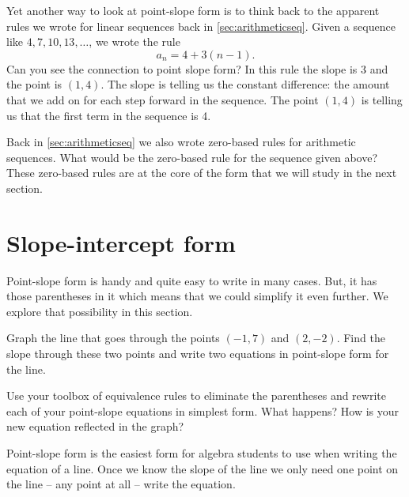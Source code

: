 Yet another way to look at point-slope form is to think back to the apparent rules we wrote for linear sequences back in \cref{sec:arithmeticseq}. Given a sequence like $4, 7, 10, 13,\dotsc$, we wrote the rule \[a_n = 4 + 3 (n-1).\] Can you see the connection to point slope form? In this rule the slope is 3 and the point is $(1,4)$. The slope is telling us the constant difference: the amount that we add on for each step forward in the sequence. The point $(1,4)$ is telling us that the first term in the sequence is 4.

Back in \cref{sec:arithmeticseq} we also wrote zero-based rules for arithmetic sequences. What would be the zero-based rule for the sequence given above? These zero-based rules are at the core of the form that we will study in the next section.

\section{Slope-intercept form}
\label{sec:slopeinterceptform}

Point-slope form is handy and quite easy to write in many cases. But, it has those parentheses in it which means that we could simplify it even further. We explore that possibility in this section.


\begin{boxexplore}
Graph the line that goes through the points $(-1, 7)$ and $(2, -2)$. Find the slope through these two points and write two equations in point-slope form for the line.

Use your toolbox of equivalence rules to eliminate the parentheses and rewrite each of your point-slope equations in simplest form. What happens? How is your new equation reflected in the graph?
\end{boxexplore} %

Point-slope form is the easiest form for algebra students to use when writing the equation of a line. Once we know the slope of the line we only need one point on the line -- any point at all -- write the equation.

